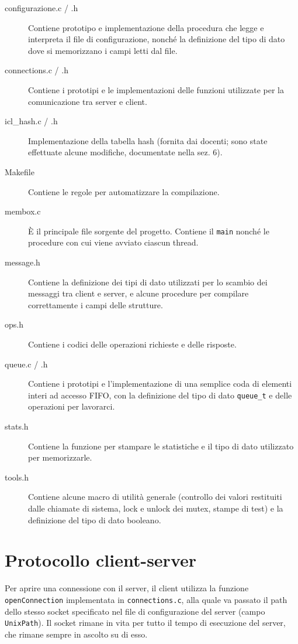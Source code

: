\documentclass[a4paper,12pt]{article}
\begin{document}
\begin{description}
 \item[configurazione.c / .h] Contiene prototipo e implementazione della procedura che legge e interpreta il file di configurazione, nonché la definizione del tipo di dato dove si memorizzano i campi letti dal file.
 \item[connections.c / .h] Contiene i prototipi e le implementazioni delle funzioni utilizzate per la comunicazione tra server e client.
 \item[icl\_hash.c / .h] Implementazione della tabella hash (fornita dai docenti; sono state effettuate alcune modifiche, documentate nella sez. 6).
 \item[Makefile] Contiene le regole per automatizzare la compilazione.
 \item[membox.c] È il principale file sorgente del progetto. Contiene il \texttt{main} nonché le procedure con cui viene avviato ciascun thread.
 \item[message.h] Contiene la definizione dei tipi di dato utilizzati per lo scambio dei messaggi tra client e server, e alcune procedure per compilare correttamente i campi delle strutture.
 \item[ops.h] Contiene i codici delle operazioni richieste e delle risposte.
 \item[queue.c / .h] Contiene i prototipi e l'implementazione di una semplice coda di elementi interi ad accesso FIFO, con la definizione del tipo di dato \texttt{queue\_t} e delle operazioni per lavorarci.
 \item[stats.h] Contiene la funzione per stampare le statistiche e il tipo di dato utilizzato per memorizzarle.
 \item[tools.h] Contiene alcune macro di utilità generale (controllo dei valori restituiti dalle chiamate di sistema, lock e unlock dei mutex, stampe di test) e la definizione del tipo di dato booleano.
\end{description}

\section{ Protocollo client-server }

Per aprire una connessione con il server, il client utilizza la funzione \texttt{openConnection} implementata in \texttt{connections.c}, alla quale va passato il path dello stesso socket specificato nel file di configurazione del server (campo \texttt{UnixPath}). Il socket rimane in vita per tutto il tempo di esecuzione del server, che rimane sempre in ascolto su di esso.
\end{document}
